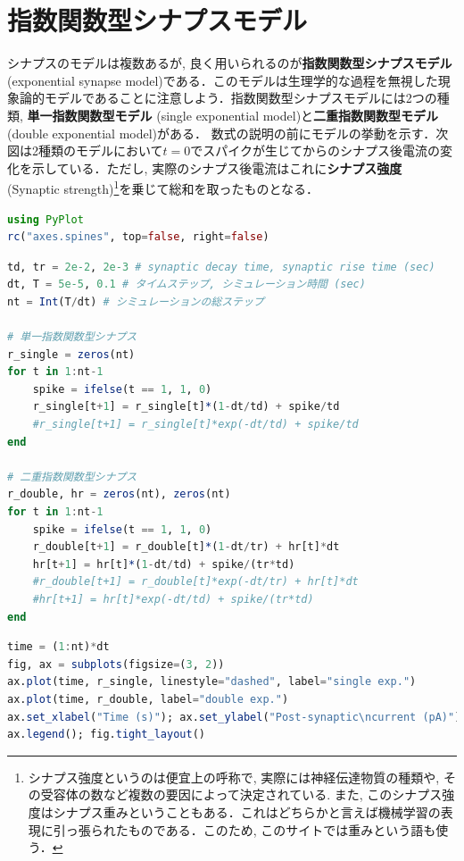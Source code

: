 \section{指数関数型シナプスモデル}
シナプスのモデルは複数あるが, 良く用いられるのが\textbf{指数関数型シナプスモデル}(exponential synapse model)である．このモデルは生理学的な過程を無視した現象論的モデルであることに注意しよう．指数関数型シナプスモデルには2つの種類, \textbf{単一指数関数型モデル} (single exponential model)と\textbf{二重指数関数型モデル} (double exponential model)がある．
数式の説明の前にモデルの挙動を示す．次図は2種類のモデルにおいて$t=0$でスパイクが生じてからのシナプス後電流の変化を示している．ただし, 実際のシナプス後電流はこれに\textbf{シナプス強度} (Synaptic strength)\footnote{シナプス強度というのは便宜上の呼称で, 実際には神経伝達物質の種類や, その受容体の数など複数の要因によって決定されている. また, このシナプス強度はシナプス重みということもある．これはどちらかと言えば機械学習の表現に引っ張られたものである．このため, このサイトでは重みという語も使う．}を乗じて総和を取ったものとなる．
\begin{lstlisting}[language=julia]
using PyPlot
rc("axes.spines", top=false, right=false)
\end{lstlisting}
\begin{lstlisting}[language=julia]
td, tr = 2e-2, 2e-3 # synaptic decay time, synaptic rise time (sec)
dt, T = 5e-5, 0.1 # タイムステップ, シミュレーション時間 (sec)
nt = Int(T/dt) # シミュレーションの総ステップ

# 単一指数関数型シナプス
r_single = zeros(nt)
for t in 1:nt-1
    spike = ifelse(t == 1, 1, 0)
    r_single[t+1] = r_single[t]*(1-dt/td) + spike/td
    #r_single[t+1] = r_single[t]*exp(-dt/td) + spike/td
end

# 二重指数関数型シナプス
r_double, hr = zeros(nt), zeros(nt)
for t in 1:nt-1
    spike = ifelse(t == 1, 1, 0)
    r_double[t+1] = r_double[t]*(1-dt/tr) + hr[t]*dt
    hr[t+1] = hr[t]*(1-dt/td) + spike/(tr*td)
    #r_double[t+1] = r_double[t]*exp(-dt/tr) + hr[t]*dt
    #hr[t+1] = hr[t]*exp(-dt/td) + spike/(tr*td)
end   
\end{lstlisting}
\begin{lstlisting}[language=julia]
time = (1:nt)*dt
fig, ax = subplots(figsize=(3, 2))
ax.plot(time, r_single, linestyle="dashed", label="single exp.")
ax.plot(time, r_double, label="double exp.")
ax.set_xlabel("Time (s)"); ax.set_ylabel("Post-synaptic\ncurrent (pA)")
ax.legend(); fig.tight_layout()
\end{lstlisting}
